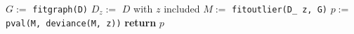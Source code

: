 \documentclass[preview]{standalone}
\begin{document}
\centering
\begin{algorithmic}[1]
  \State $G:=$ \texttt{fit\textunderscore graph(D)} 
  \State $D_z :=$ $D$ with $z$ included
  \State $M:=$ \texttt{fit\textunderscore outlier(D\_ z, G)}
  \State $p:=$ \texttt{pval(M, deviance(M, z))}
  \State \textbf{return} $p$
  \EndProcedure
\end{algorithmic}
\end{document}
